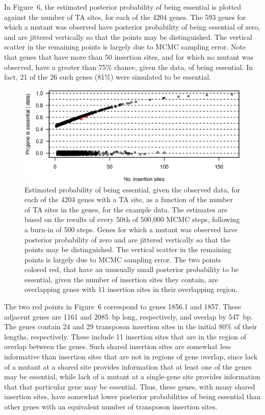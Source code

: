 \documentclass[letterpaper]{article}
\begin{document}
\begin{multicols}{2}
In Figure~6, the estimated posterior probability of being essential is
plotted against the number of TA sites, for each of the 4204 genes.
The 593 genes for which a mutant was observed have posterior
probability of being essential of zero, and are jittered vertically so
that the points may be distinguished.  The vertical scatter in the
remaining points is largely due to MCMC sampling error.  Note that
genes that have more than 50 insertion sites, and for which no mutant
was observed, have a greater than 75\% chance, given the data, of
being essential.  In fact, 21 of the 26 such genes (81\%) were
simulated to be essential.

\begin{figure}
\begin{center}
\includegraphics{Figs/fig6.ps}
\caption{Estimated probability of being essential, given the observed
data, for each of the 4204 genes with a TA site, as a function of the
number of TA sites in the genes, for the example data.  The estimates
are based on the results of every 50th of 500,000 MCMC steps,
following a burn-in of 500 steps.  Genes for which a mutant was
observed have posterior probability of zero and are jittered
vertically so that the points may be distinguished.  The vertical
scatter in the remaining points is largely due to MCMC sampling error.
The two points colored red, that have an unusually small posterior
probability to be essential, given the number of insertion sites they
contain, are overlapping genes with 11 insertion sites in their
overlapping region.}
\end{center}
\end{figure}

The two red points in Figure~6 correspond to genes 1856.1 and 1857.
These adjacent genes are 1161 and 2085~bp long, respectively, and
overlap by 547~bp.  The genes contain 24 and 29 transposon insertion
sites in the initial 80\% of their lengths, respectively.  These
include 11 insertion sites that are in the region of overlap between
the genes.  Such shared insertion sites are somewhat less informative
than insertion sites that are not in regions of gene overlap, since
lack of a mutant at a shared site provides information that at least
one of the genes may be essential, while lack of a mutant at a
single-gene site provides information that that particular gene may be
essential.  Thus, these genes, with many shared insertion sites, have
somewhat lower posterior probabilities of being essential than other
genes with an equivalent number of transposon insertion sites.


\end{multicols}
\end{document}
